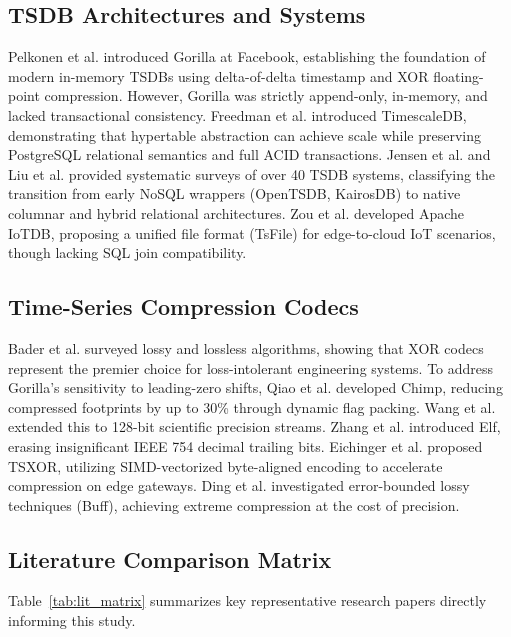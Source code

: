 \documentclass[conference,a4paper]{IEEEtran}
\begin{document}
\subsection{TSDB Architectures and Systems}
Pelkonen et al. \cite{pelkonen2015gorilla} introduced Gorilla at Facebook, establishing the foundation of modern in-memory TSDBs using delta-of-delta timestamp and XOR floating-point compression. However, Gorilla was strictly append-only, in-memory, and lacked transactional consistency. Freedman et al. \cite{freedman2017timescaledb} introduced TimescaleDB, demonstrating that hypertable abstraction can achieve scale while preserving PostgreSQL relational semantics and full ACID transactions. Jensen et al. \cite{jensen2017timeseries} and Liu et al. \cite{liu2024comprehensive} provided systematic surveys of over 40 TSDB systems, classifying the transition from early NoSQL wrappers (OpenTSDB, KairosDB) to native columnar and hybrid relational architectures. Zou et al. \cite{zou2021iotdb} developed Apache IoTDB, proposing a unified file format (TsFile) for edge-to-cloud IoT scenarios, though lacking SQL join compatibility.

\subsection{Time-Series Compression Codecs}
Bader et al. \cite{bader2021survey} surveyed lossy and lossless algorithms, showing that XOR codecs represent the premier choice for loss-intolerant engineering systems. To address Gorilla's sensitivity to leading-zero shifts, Qiao et al. \cite{qiao2022chimp} developed Chimp, reducing compressed footprints by up to 30\% through dynamic flag packing. Wang et al. \cite{wang2023chimp128} extended this to 128-bit scientific precision streams. Zhang et al. \cite{zhang2022elf} introduced Elf, erasing insignificant IEEE 754 decimal trailing bits. Eichinger et al. \cite{eichinger2023tsxor} proposed TSXOR, utilizing SIMD-vectorized byte-aligned encoding to accelerate compression on edge gateways. Ding et al. \cite{ding2022buff} investigated error-bounded lossy techniques (Buff), achieving extreme compression at the cost of precision.

\subsection{Literature Comparison Matrix}
Table~\ref{tab:lit_matrix} summarizes key representative research papers directly informing this study.
\end{document}
